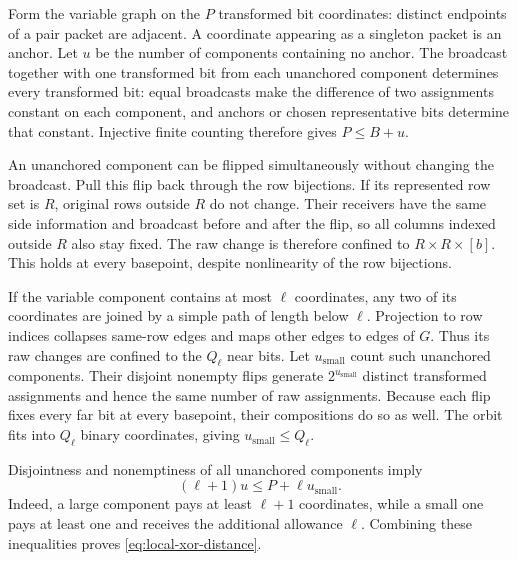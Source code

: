 \begin{proofoutline}
Form the variable graph on the $P$ transformed bit coordinates: distinct
endpoints of a pair packet are adjacent.  A coordinate appearing as a
singleton packet is an anchor.  Let $u$ be the number of components containing
no anchor.  The broadcast together with one transformed bit from each
unanchored component determines every transformed bit: equal broadcasts make
the difference of two assignments constant on each component, and anchors or
chosen representative bits determine that constant.  Injective finite counting
therefore gives $P\le B+u$.

An unanchored component can be flipped simultaneously without changing the
broadcast.  Pull this flip back through the row bijections.  If its represented
row set is $R$, original rows outside $R$ do not change.  Their receivers have
the same side information and broadcast before and after the flip, so all
columns indexed outside $R$ also stay fixed.  The raw change is therefore
confined to $R\times R\times[b]$.  This holds at every basepoint, despite
nonlinearity of the row bijections.

If the variable component contains at most $\ell$ coordinates, any two of
its coordinates are joined by a simple path of length below $\ell$.
Projection to row indices collapses same-row edges and maps other edges to
edges of $G$.  Thus its raw changes are confined to the $Q_\ell$ near bits.
Let $u_{\mathrm{small}}$ count such unanchored components.  Their disjoint
nonempty flips generate $2^{u_{\mathrm{small}}}$ distinct transformed
assignments and hence the same number of raw assignments.  Because each flip
fixes every far bit at every basepoint, their compositions do so as well.
The orbit fits into $Q_\ell$ binary coordinates, giving
$u_{\mathrm{small}}\le Q_\ell$.

Disjointness and nonemptiness of all unanchored components imply
\[
  (\ell+1)u\le P+\ell u_{\mathrm{small}}.
\]
Indeed, a large component pays at least $\ell+1$ coordinates, while a small
one pays at least one and receives the additional allowance $\ell$.
Combining these inequalities proves \eqref{eq:local-xor-distance}.
\end{proofoutline}

